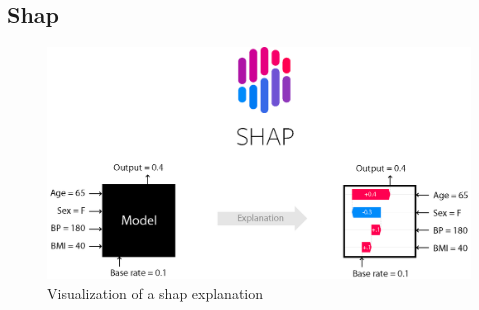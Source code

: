 \documentclass[en]{sdqbeamer}
\begin{document}
\begin{large}

\section{Shap}

\begin{frame}
    \begin{figure}[H]
    \centering
    \includegraphics[width=\linewidth,height=0.8\textheight,keepaspectratio]{images/ShapExplanationVisualized.png}
    \caption{Visualization of a shap explanation \cite{shapDocs}}
    \label{fig:shap_visualization}
\end{figure}
\end{frame}


\end{large}
\end{document}
